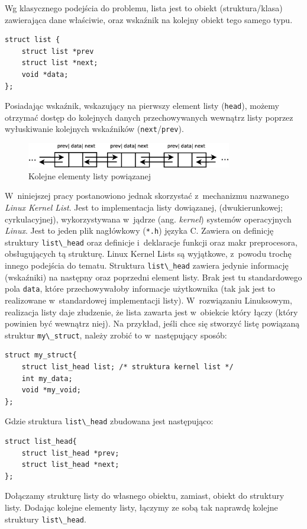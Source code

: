 \documentclass[a4paper,12pt,polish,oneside,openright]{thesis}
\newcommand\code[1]{\lstinline[style=line]{#1}}
\begin{document}
Wg klasycznego podejścia do problemu, lista jest to obiekt (struktura/klasa) zawierająca dane właściwie, oraz wskaźnik na kolejny obiekt tego samego typu.\cite{algo}
\begin{lstlisting}[style=code,caption=Idea listy powiązanej w~C]
struct list {
	struct list *prev
	struct list *next;
	void *data;
};
\end{lstlisting}
Posiadając wskaźnik, wskazujący na pierwszy element listy (\code{head}), możemy otrzymać dostęp do kolejnych danych przechowywanych wewnątrz listy poprzez wyłuskiwanie kolejnych wskaźników (\code{next}/\code{prev}).

\begin{figure}[htb]
	\begin{center}
		\includegraphics[width=0.80\textwidth]{gfx/linkedlist.eps}
		\caption{Kolejne elementy listy powiązanej}
	\end{center}
\end{figure}

W~niniejszej pracy postanowiono jednak skorzystać z~mechanizmu nazwanego \emph{Linux Kernel List}.
Jest to implementacja listy dowiązanej, (dwukierunkowej; cyrkulacyjnej), wykorzystywana w~jądrze (ang. \emph{kernel}) systemów operacyjnych \emph{Linux}\cite{lkl}.
Jest to jeden plik nagłówkowy (\code{*.h}) języka C.
Zawiera on definicję struktury \code{list\_head} oraz definicje i~deklaracje funkcji oraz makr preprocesora, obsługujących tą strukturę.
Linux Kernel Lists są wyjątkowe, z~powodu trochę innego podejścia do tematu.
Struktura \code{list\_head} zawiera jedynie informację (wskaźniki) na następny oraz poprzedni element listy.
Brak jest tu standardowego pola \code{data}, które przechowywałoby informacje użytkownika (tak jak jest to realizowane w~standardowej implementacji listy).
W~rozwiązaniu Linuksowym, realizacja listy daje złudzenie, że lista zawarta jest w~obiekcie który łączy (który powinien być wewnątrz niej).
Na przykład, jeśli chce się stworzyć listę powiązaną struktur \code{my\_struct}, należy zrobić to w~następujący sposób:
\begin{lstlisting}[style=code,caption=Przykład tworzenia listy powiązanej za pomocą Kernel Lined List]
struct my_struct{
	struct list_head list; /* struktura kernel list */
	int my_data;
	void *my_void;
};
\end{lstlisting}
Gdzie struktura \code{list\_head} zbudowana jest następująco:
\begin{lstlisting}[style=code]
struct list_head{
	struct list_head *prev;
	struct list_head *next;
};
\end{lstlisting}
Dołączamy strukturę listy do własnego obiektu, zamiast, obiekt do struktury listy.
Dodając kolejne elementy listy, łączymy ze sobą tak naprawdę kolejne struktury \code{list\_head}.
\end{document}
